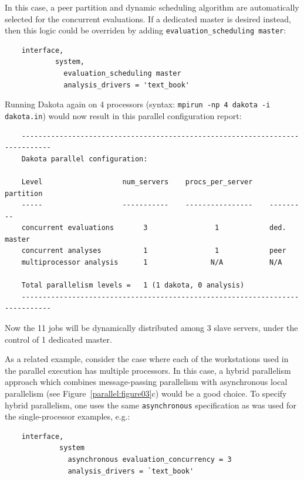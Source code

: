 In this case, a peer partition and dynamic scheduling algorithm are
automatically selected for the concurrent evaluations. If a dedicated
master is desired instead, then this logic could be overriden by adding
\texttt{evaluation\_scheduling master}:
\begin{small}
\begin{verbatim}
    interface,
            system,
              evaluation_scheduling master
              analysis_drivers = 'text_book'
\end{verbatim}
\end{small}

Running Dakota again on 4 processors (syntax: \texttt{mpirun -np 4
  dakota -i dakota.in}) would now result in this parallel
configuration report:
\begin{small}
\begin{verbatim}
    -----------------------------------------------------------------------------
    Dakota parallel configuration:

    Level                   num_servers    procs_per_server    partition
    -----                   -----------    ----------------    ---------
    concurrent evaluations       3                1            ded. master
    concurrent analyses          1                1            peer
    multiprocessor analysis      1               N/A           N/A

    Total parallelism levels =   1 (1 dakota, 0 analysis)
    -----------------------------------------------------------------------------
\end{verbatim}
\end{small}

Now the 11 jobs will be dynamically distributed among 3 slave servers,
under the control of 1 dedicated master.

As a related example, consider the case where each of the workstations
used in the parallel execution has multiple processors. In this case,
a hybrid parallelism approach which combines message-passing
parallelism with asynchronous local parallelism (see
Figure~\ref{parallel:figure03}c) would be a good choice. To specify
hybrid parallelism, one uses the same \texttt{asynchronous}
specification as was used for the single-processor examples, e.g.:
\begin{small}
\begin{verbatim}
    interface,
             system
               asynchronous evaluation_concurrency = 3
               analysis_drivers = `text_book'
\end{verbatim}
\end{small}

